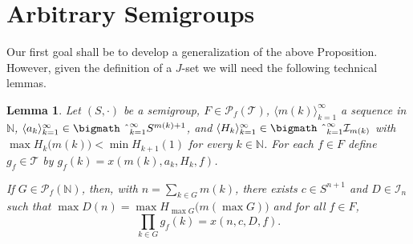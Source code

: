 \documentclass[12pt]{article}
\theoremstyle{plain}
\newtheorem{lem}[thm]{Lemma}
\theoremstyle{definition}
\newcommand{\la}{\langle}
\newcommand{\ra}{\rangle}
\newcommand{\bbN}{\mathbb{N}}
\newcommand{\calI}{\mathcal{I}}
\newcommand{\calT}{\mathcal{T}}
\newcommand{\Pf}{\mathcal{P}_f}
\newcommand{\bigtimes}{\hbox{\bigmath \char'2}}
\begin{document}
\section{Arbitrary Semigroups}
Our first goal shall be to develop a generalization of the above
Proposition. 
However, given the definition of a $J$-set we will need the following
technical lemmas.

\begin{lem}
  \label{lem:prodrewrt}
  Let $(S, \cdot)$ be  a semigroup, $F \in \Pf(\calT)$, $\la m(k)
  \ra_{k=1}^\infty$ a sequence in $\bbN$, $\la a_k \ra_{k=1}^\infty
  \in \bigtimes_{k=1}^\infty S^{m(k)+1}$, and $\la H_k
  \ra_{k=1}^\infty \in \bigtimes_{k=1}^\infty \calI_{m(k)}$ with $\max
  H_k\bigl(m(k)\bigr) < \min H_{k+1}(1)$ for every $k \in \bbN$.
  For each $f \in F$ define $g_f \in \calT$ by $g_f(k) = x(m(k), a_k,
  H_k, f)$. 

  If $G \in \Pf(\bbN)$, then, with $n = \sum_{k \in G} m(k)$, there
  exists $c \in S^{n+1}$ and $D \in \calI_n$ such that $\max D(n) =
  \max H_{\max G}\bigl(m(\max G)\bigr)$ and for all $f \in F$, 
  \[
    \prod_{k \in G} g_f(k) = x(n, c, D, f).
  \]
\end{lem}
\end{document}
